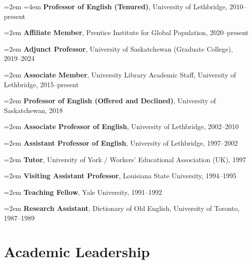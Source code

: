 \documentclass[12pt]{article}
\begin{document}
{\leftskip=2em
\hangindent=4em
\noindent
\textbf{Professor of English (Tenured)}, University of Lethbridge, 2010–present

\vspace{0.5em}
\hangindent=2em
\noindent
\textbf{Affiliate Member}, Prentice Institute for Global Population, 2020–present

\vspace{0.5em}
\hangindent=2em
\noindent
\textbf{Adjunct Professor}, University of Saskatchewan (Graduate College), 2019–2024

\vspace{0.5em}
\hangindent=2em
\noindent
\textbf{Associate Member}, University Library Academic Staff, University of Lethbridge, 2015–present

\vspace{0.5em}
\hangindent=2em
\noindent
\textbf{Professor of English (Offered and Declined)}, University of Saskatchewan, 2018

\vspace{0.5em}
\hangindent=2em
\noindent
\textbf{Associate Professor of English}, University of Lethbridge, 2002–2010

\vspace{0.5em}
\hangindent=2em
\noindent
\textbf{Assistant Professor of English}, University of Lethbridge, 1997–2002

\vspace{0.5em}
\hangindent=2em
\noindent
\textbf{Tutor}, University of York / Workers’ Educational Association (UK), 1997

\vspace{0.5em}
\hangindent=2em
\noindent
\textbf{Visiting Assistant Professor}, Louisiana State University, 1994–1995

\vspace{0.5em}
\hangindent=2em
\noindent
\textbf{Teaching Fellow}, Yale University, 1991–1992

\vspace{0.5em}
\hangindent=2em
\noindent
\textbf{Research Assistant}, Dictionary of Old English, University of Toronto, 1987–1989

}

\section*{Academic Leadership}
\end{document}
